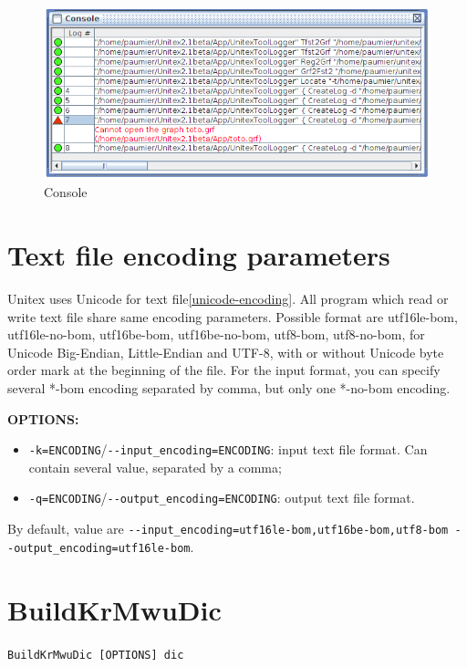 \bigskip
\begin{figure}[!h]
\begin{center}
\includegraphics[width=15cm]{resources/img/fig11-2.png}
\caption{Console\label{fig-console}}
\end{center}
\end{figure}


\section{Text file encoding parameters}
\label{section-text-file-encoding-parameters}
Unitex uses Unicode for text file\ref{unicode-encoding}. All program which read or write
text file share same encoding parameters. Possible format are 
utf16le-bom, utf16le-no-bom, utf16be-bom, utf16be-no-bom, utf8-bom, utf8-no-bom, 
for Unicode Big-Endian, Little-Endian and UTF-8, with or without Unicode byte order mark at the beginning of the file.
For the input format, you can specify several *-bom encoding separated by comma, but only one *-no-bom encoding.

\bigskip
\noindent \textbf{OPTIONS:}
\begin{itemize}
  \item \verb+-k=ENCODING+/\verb+--input_encoding=ENCODING+: input text file format. Can contain several value, separated by a comma;
  \item \verb+-q=ENCODING+/\verb+--output_encoding=ENCODING+: output text file format. 
\end{itemize}

By default, value are \verb+--input_encoding=utf16le-bom,utf16be-bom,utf8-bom --output_encoding=utf16le-bom+.


\section{BuildKrMwuDic}
\verb+BuildKrMwuDic [OPTIONS] dic+

